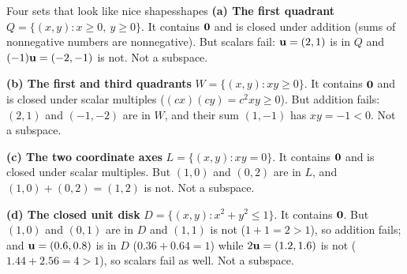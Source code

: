 \documentclass[11pt]{article}
\begin{document}
\begin{exmp}{Four sets that look like nice shapes}{shapes}
\textbf{(a) The first quadrant} $Q=\{(x,y):x\geq0,\ y\geq0\}$. It contains $\mathbf{0}$ and is closed under addition (sums of nonnegative numbers are nonnegative). But scalars fail: $\mathbf{u}=(2,1)$ is in $Q$ and $(-1)\mathbf{u}=(-2,-1)$ is not. Not a subspace.

\textbf{(b) The first and third quadrants} $W=\{(x,y):xy\geq0\}$. It contains $\mathbf{0}$ and is closed under scalar multiples ($(cx)(cy)=c^2xy\geq0$). But addition fails: $(2,1)$ and $(-1,-2)$ are in $W$, and their sum $(1,-1)$ has $xy=-1<0$. Not a subspace.

\textbf{(c) The two coordinate axes} $L=\{(x,y):xy=0\}$. It contains $\mathbf{0}$ and is closed under scalar multiples. But $(1,0)$ and $(0,2)$ are in $L$, and $(1,0)+(0,2)=(1,2)$ is not. Not a subspace.

\textbf{(d) The closed unit disk} $D=\{(x,y):x^2+y^2\leq1\}$. It contains $\mathbf{0}$. But $(1,0)$ and $(0,1)$ are in $D$ and $(1,1)$ is not ($1+1=2>1$), so addition fails; and $\mathbf{u}=(0.6,0.8)$ is in $D$ ($0.36+0.64=1$) while $2\mathbf{u}=(1.2,1.6)$ is not ($1.44+2.56=4>1$), so scalars fail as well. Not a subspace.
\end{exmp}
\end{document}
